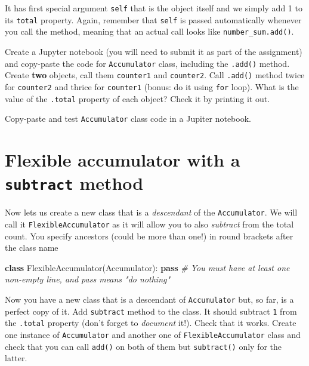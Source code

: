 \documentclass[
]{book}
\newenvironment{Shaded}{\begin{snugshade}}{\end{snugshade}}
\newcommand{\CommentTok}[1]{\textcolor[rgb]{0.56,0.35,0.01}{\textit{#1}}}
\newcommand{\ControlFlowTok}[1]{\textcolor[rgb]{0.13,0.29,0.53}{\textbf{#1}}}
\newcommand{\KeywordTok}[1]{\textcolor[rgb]{0.13,0.29,0.53}{\textbf{#1}}}
\newcommand{\NormalTok}[1]{#1}
\begin{document}
It has first special argument \texttt{self} that is the object itself and we simply add 1 to its \texttt{total} property. Again, remember that \texttt{self} is passed automatically whenever you call the method, meaning that an actual call looks like \texttt{number\_sum.add()}.

Create a Jupyter notebook (you will need to submit it as part of the assignment) and copy-paste the code for \texttt{Accumulator} class, including the \texttt{.add()} method. Create \textbf{two} objects, call them \texttt{counter1} and \texttt{counter2}. Call \texttt{.add()} method twice for \texttt{counter2} and thrice for \texttt{counter1} (bonus: do it using \texttt{for} loop). What is the value of the \texttt{.total} property of each object? Check it by printing it out.

Copy-paste and test \texttt{Accumulator} class code in a Jupiter notebook.

\hypertarget{flexible-accumulator-with-a-subtract-method}{%
\section{\texorpdfstring{Flexible accumulator with a \texttt{subtract} method}{Flexible accumulator with a subtract method}}\label{flexible-accumulator-with-a-subtract-method}}

Now lets us create a new class that is a \emph{descendant} of the \texttt{Accumulator}. We will call it \texttt{FlexibleAccumulator} as it will allow you to also \emph{subtract} from the total count. You specify ancestors (could be more than one!) in round brackets after the class name

\begin{Shaded}
\begin{Highlighting}[]
\KeywordTok{class}\NormalTok{ FlexibleAccumulator(Accumulator):}
    \ControlFlowTok{pass} \CommentTok{\# You must have at least one non{-}empty line, and pass means "do nothing"}
\end{Highlighting}
\end{Shaded}

Now you have a new class that is a descendant of \texttt{Accumulator} but, so far, is a perfect copy of it. Add \texttt{subtract} method to the class. It should subtract \texttt{1} from the \texttt{.total} property (don't forget to \emph{document} it!). Check that it works. Create one instance of \texttt{Accumulator} and another one of \texttt{FlexibleAccumulator} class and check that you can call \texttt{add()} on both of them but \texttt{subtract()} only for the latter.
\end{document}
